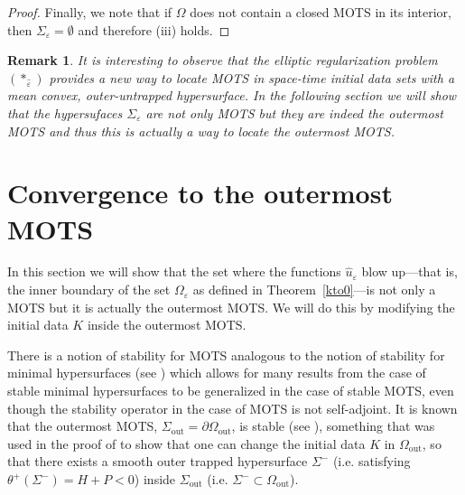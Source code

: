 \documentclass[11pt]{amsart}
\newtheorem{Remark}[Theorem]{Remark}
\renewcommand{\epsilon}{\varepsilon}
\def\e{\epsilon}
\def\out{\text{out}}
\begin{document}
\begin{proof}
Finally, we note that if $\Omega$ does not contain a closed MOTS in its interior, then $\Sigma_\e=\emptyset$ and therefore (iii) holds.
\end{proof}


\begin{Remark} It is interesting to observe that the elliptic regularization problem $(*_{\hat{\varepsilon}})$ provides a new way to locate MOTS in space-time initial data sets with a mean convex, outer-untrapped hypersurface. In the following section we will show that the hypersufaces $\Sigma_\e$ are not only  MOTS but they are indeed  the outermost MOTS and thus this is actually a way to  locate the outermost MOTS.
\end{Remark}

\section{Convergence to the outermost MOTS}\label{outermostMOTSsection}

In this section we will show that the set where the functions $\hat u_\e$ blow up---that is, the inner boundary of the set $\Omega_\e$ as defined in Theorem~\ref{kto0}---is not only a MOTS but it is actually the outermost MOTS. We will do this by modifying the initial data $K$ inside the outermost MOTS.


There is a notion of stability for MOTS analogous to the notion of stability for minimal hypersurfaces (see \cite{AMS08}) which allows for many results  from the case of stable minimal hypersurfaces to be generalized in the case of stable MOTS, even though the stability operator in the case of MOTS is not
self-adjoint. 
It is known that the outermost MOTS, $\Sigma_\out=\partial \Omega_\out$, is stable (see \cite{AM09}), something that  was used in  the proof of \cite[Theorem 5.1]{AM09} to show that one can change the  initial data $K$ in $\Omega_\out$, so that there exists a smooth outer trapped hypersurface $\Sigma^-$ (i.e. satisfying $\theta^+(\Sigma^-)=H+P<0$) inside $\Sigma_\out$ (i.e. $\Sigma^-\subset\Omega_\out$). 
\end{document}
